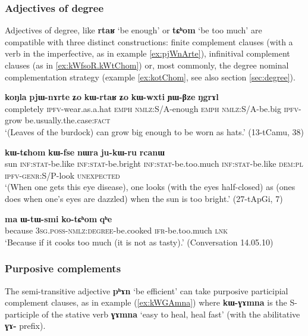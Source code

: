\documentclass[oldfontcommands,oneside,a4paper,11pt]{article}
\newcommand{\ipa}[1]{\textbf{\phon#1}} %
\newcommand{\jpg}[2]{\ipa{#1} `#2'} %
\begin{document}
\subsubsection{Adjectives of degree} \label{sec:degree.complement}
Adjectives of degree, like \jpg{rtaʁ}{be enough} or \jpg{tɕʰom}{be too much} are compatible with three distinct constructions: finite complement clauses (with a verb in the imperfective, as in example \ref{ex:pjWnArte}), infinitival complement clauses (as in \ref{ex:kWfsoR.kWtChom}) or, most commonly, the degree nominal complementation strategy (example \ref{ex:kotChom}, see also section \ref{sec:degree}).

\begin{exe}
\ex \label{ex:pjWnArte}
\gll \ipa{koŋla} 	\ipa{pjɯ-nɤrte} 	\ipa{ʑo} 	\ipa{kɯ-rtaʁ} 	\ipa{ʑo} 	\ipa{kɯ-wxti} 	\ipa{ɲɯ-βze} 	\ipa{ŋgrɤl}  \\
completely \textsc{ipfv}-wear.as.a.hat \textsc{emph} \textsc{nmlz}:S/A-enough \textsc{emph} \textsc{nmlz}:S/A-be.big \textsc{ipfv}-grow be.usually.the.case:\textsc{fact} \\
\glt `(Leaves of the burdock) can grow big enough to be worn as hats.' (13-tCamu, 38)
\end{exe}
 
\begin{exe}
\ex \label{ex:kWfsoR.kWtChom}
\gll [\ipa{tɤŋe} 	\ipa{kɯ-fse} 	\ipa{kɯ-fsoʁ}] 	\ipa{kɯ-tɕhom} 	\ipa{kɯ-fse} 	\ipa{nɯra} 	\ipa{ju-kɯ-ru} 	\ipa{rcanɯ} \\
sun \textsc{inf:stat}-be.like \textsc{inf:stat}-be.bright \textsc{inf:stat}-be.too.much \textsc{inf:stat}-be.like \textsc{dem:pl} \textsc{ipfv-genr}:S/P-look \textsc{unexpected} \\
\glt `(When one gets this eye disease), one looks (with the eyes half-closed) as (ones does when one's eyes are dazzled) when the sun is too bright.' (27-tApGi, 7)
\end{exe}

\begin{exe}
\ex \label{ex:kotChom}
\gll
\ipa{ma} 	\ipa{ɯ-tɯ-smi} 	\ipa{ko-tɕʰom} 	\ipa{qʰe} \\
because \textsc{3sg.poss-nmlz:degree}-be.cooked \textsc{ifr}-be.too.much \textsc{lnk} \\
\glt `Because if it cooks too much (it is not as tasty).' (Conversation 14.05.10)
\end{exe}

\subsubsection{Purposive complements}
The semi-transitive adjective \jpg{pʰɤn}{be efficient} can take purposive participial complement clauses, as in example (\ref{ex:kWGAmna}) where \ipa{kɯ-ɣɤmna} is the S-participle of the stative verb \ipa{ɣɤmna} `easy to heal, heal fast' (with the abilitative \ipa{ɣɤ-} prefix). 
 
\end{document}
